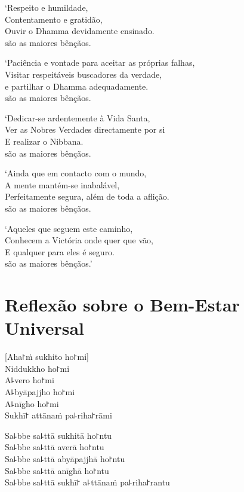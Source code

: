 `Respeito e humildade,\\
Contentamento e gratidão,\\
Ouvir o Dhamma devidamente ensinado.\\
 são as maiores bênçãos.

`Paciência e vontade para aceitar as próprias falhas,\\
Visitar respeitáveis buscadores da verdade,\\
e partilhar o Dhamma adequadamente.\\
 são as maiores bênçãos.

\clearpage

`Dedicar-se ardentemente à Vida Santa,\\
Ver as Nobres Verdades directamente por si\\
E realizar o Nibbana.\\
 são as maiores bênçãos.

`Ainda que em contacto com o mundo,\\
A mente mantém-se inabalável,\\
Perfeitamente segura, além de toda a aflição.\\
 são as maiores bênçãos.

`Aqueles que seguem este caminho,\\
Conhecem a Victória onde quer que vão,\\
E qualquer  para eles é seguro.\\
 são as maiores bênçãos.'

\chapter*[Bem-Estar Universal]{Reflexão sobre o Bem-Estar Universal}

\delegateSetUseNext


\begin{leader}
\end{leader}

[Aha꜓ṁ sukhito ho꜓mi]\\
Niddukkho ho꜓mi\\
A꜕vero ho꜓mi\\
A꜕byāpajjho ho꜓mi\\
A꜕nīgho ho꜓mi\\
Sukhī꜓ attānaṁ pa꜕riha꜓rāmi

Sa꜕bbe sa꜕ttā sukhitā ho꜓ntu\\
Sa꜕bbe sa꜕ttā averā ho꜓ntu\\
Sa꜕bbe sa꜕ttā abyāpajjhā ho꜓ntu\\
Sa꜕bbe sa꜕ttā anīghā ho꜓ntu\\
Sa꜕bbe sa꜕ttā sukhī꜓ a꜕ttānaṁ pa꜕riha꜓rantu

